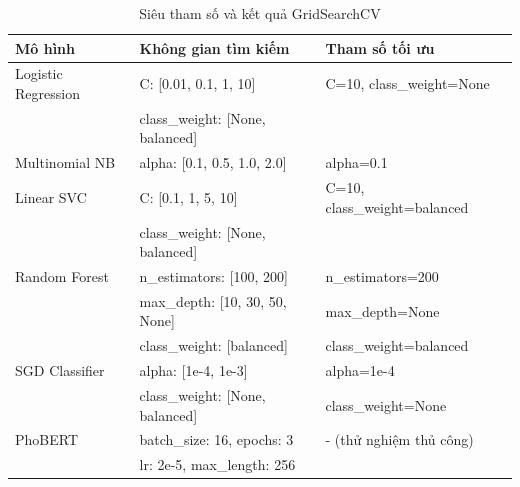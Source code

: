\begin{table}[H]
\centering
\caption{Siêu tham số và kết quả GridSearchCV}
\label{tab:hyperparams}
\begin{tabular}{|l|l|l|}
\hline
\textbf{Mô hình} & \textbf{Không gian tìm kiếm} & \textbf{Tham số tối ưu} \\
\hline
Logistic Regression & C: [0.01, 0.1, 1, 10] & C=10, class\_weight=None \\
 & class\_weight: [None, balanced] & \\
\hline
Multinomial NB & alpha: [0.1, 0.5, 1.0, 2.0] & alpha=0.1 \\
\hline
Linear SVC & C: [0.1, 1, 5, 10] & C=10, class\_weight=balanced \\
 & class\_weight: [None, balanced] & \\
\hline
Random Forest & n\_estimators: [100, 200] & n\_estimators=200 \\
 & max\_depth: [10, 30, 50, None] & max\_depth=None \\
 & class\_weight: [balanced] & class\_weight=balanced \\
\hline
SGD Classifier & alpha: [1e-4, 1e-3] & alpha=1e-4 \\
 & class\_weight: [None, balanced] & class\_weight=None \\
\hline
PhoBERT & batch\_size: 16, epochs: 3 & - (thử nghiệm thủ công) \\
 & lr: 2e-5, max\_length: 256 & \\
\hline
\end{tabular}
\end{table}
